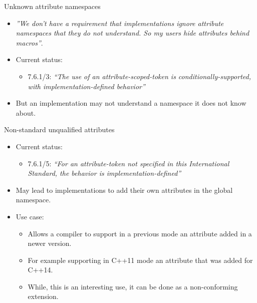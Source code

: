 \begin{frame}[t]{Unknown attribute namespaces}
\begin{itemize}
  \item \emph{''We don't have a requirement that implementations ignore
attribute namespaces that they do not understand. So my users hide attributes
behind macros''}.

  \vfill
  \item Current status:
    \begin{itemize}
      \item 7.6.1/3: \emph{``The use of an attribute-scoped-token is
conditionally-supported, with implementation-defined behavior''} 
    \end{itemize}

  \vfill
  \item But an implementation may not understand a namespace it does not know about.
\end{itemize}
\end{frame}

\begin{frame}[t]{Non-standard unqualified attributes}
\begin{itemize}
  \item Current status:
    \begin{itemize}
      \item 7.6.1/5: \emph{``For an attribute-token
      not specified in this International Standard, the behavior is
      implementation-defined''}
    \end{itemize}
 
  \vfill
  \item May lead to implementations to add their own attributes in the global namespace.

  \vfill\pause
  \item Use case:
    \begin{itemize}
      \item Allows a compiler
to support in a previous mode an attribute added in a newer version. 
      \item For example
supporting in C++11 mode an attribute that was added for C++14. 
      \item While, this is an
interesting use, it can be done as a non-conforming extension.

    \end{itemize}
\end{itemize}
\end{frame}
